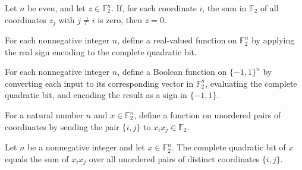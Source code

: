 \begin{theorem}
\label{FABL.completeQuadraticPolarFrequency_eq_zero_of_even}
\leanok
{}
Let $n$ be even, and let $z\in\mathbb F_2^n$. If, for each coordinate $i$, the sum in
$\mathbb F_2$ of all coordinates $z_j$ with $j\ne i$ is zero, then $z=0$.
\end{theorem}

\begin{definition}
\label{FABL.completeQuadratic}
\leanok
{}
For each nonnegative integer $n$, define a real-valued function on $\mathbb F_2^n$ by
applying the real sign encoding to the complete quadratic bit.
\end{definition}

\begin{definition}
\label{FABL.completeQuadraticBoolean}
\leanok
{}
For each nonnegative integer $n$, define a Boolean function on $\{-1,1\}^n$ by
converting each input to its corresponding vector in $\mathbb F_2^n$, evaluating the
complete quadratic bit, and encoding the result as a sign in $\{-1,1\}$.
\end{definition}

\begin{definition}
\label{FABL.sym2CoordinateProduct}
\leanok
{}
For a natural number $n$ and $x\in\mathbb{F}_2^n$, define a function on unordered pairs
of coordinates by sending the pair $\{i,j\}$ to $x_i x_j\in\mathbb{F}_2$.
\end{definition}

\begin{theorem}
\label{FABL.completeQuadraticBit_eq_sym2_sum}
\leanok
{}
Let $n$ be a nonnegative integer and let $x\in\mathbb{F}_2^n$. The complete quadratic
bit of $x$ equals the sum of $x_i x_j$ over all unordered pairs of distinct coordinates
$\{i,j\}$.
\end{theorem}

